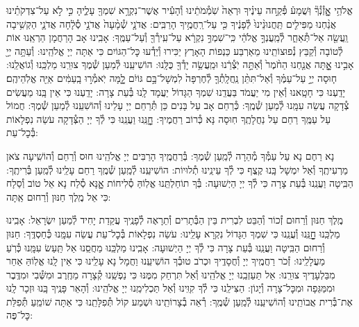 \documentclass[twoside, openany, parskip=half, 11pt]{book}
\begin{document}
אֱלֹהַ֥י אׇׇׇׇזְ֯נְ֯ךָ֘ וּֽשֲׁמָע֒ פְּ֯קַ֣חה עֵינֶ֗יךָ וּרְאֵה֙ שֹֽׁמְ֯מֹתֵ֔ינוּ וְ֯הָעִ֕יר אֲשֶׁר־נִקְרָ֥א שִׁמְךָ֖ עָלֶ֑יהָ כִּ֣י לֹ֣א עַל־צִדְקֹתֵ֗ינוּ אֲנַ֨חְנוּ מַפִּילִ֤ים תַּֽחֲנוּנֵ֨ינוּ֙ לְ֯פָנֶ֔יךָ כִּ֖י עַל־רַֽחֲמֶ֥יךָ הָרַבִּֽים: אֲדֹנָ֤י שְׁ֯מָ֨עָה֙ אֲדֹנָ֣י סְ֯לָ֔חָה אֲדֹנָ֛י הַקְשִׁ֥יבָה וַֽעֲשֵׂ֖ה אַל־תְּ֯אַחַ֑ר לְ֯מַֽעֲנְךָ֣ אֱלֹהַ֔י כִּֽי־שִׁמְךָ֣ נִקְרָ֔א עַל־עִֽירְ֯ךָ֖ וְ֯עַל־עַמֶּֽךָ: אָבִֽינוּ אָב הָרַחֲמָן הַרְאֵֽנוּ אוֹת לְ֯טוֹבָה וְ֯קַבֵּץ נְ֯פוּצוֹתֵֽינוּ מֵאַרְבַּע כַּנְפוֹת הָאָרֶץ יַכִּירוּ וְ֯יֵדְ֯עוּ כׇּל־הַגּוֹיִם כִּי אַתָּה יְיָ אֱלֹהֵֽינוּ:
וְ֯עַתָּ֥ה יְיָ֖ אָבִ֣ינוּ אׇׇׇׇׇֽתָּה אֲנַ֤חְנוּ הַחֹ֨מֶר֙ וְ֯אַתָּ֣ה יֹֽצְ֯רֵ֔נוּ וּמַֽעֲשֵׂ֥ה יָדְ֯ךָ֖ כֻּלָּֽנוּ: הוֹשִׁיעֵֽנוּ לְ֯מַעַן שְׁ֯מֶךָ צוּרֵֽנוּ מַלְכֵּֽנוּ וְ֯גוֹאֲלֵֽנוּ:
ח֧וּסָה יְיָ֣ עַל־עַמֶּ֗ךָ וְ֯אַל־תִּתֵּ֨ן נַֽחֲלָֽתְ֯ךָ֤ לְ֯חֶרְפָּה֙ לִמְשָׁל־בָּ֣ם גּוֹיִ֔ם לׇׇׇ֚מָּה יֹֽאמְ֯ר֣וּ בָֽעַמִּ֔ים אַיֵּ֖ה אֱלֹֽהֵיהֶֽם׃ יָדַֽעְנוּ כִּי חָטָֽאנוּ וְ֯אֵין מִי יַעֲמֹד בַּעֲדֵֽנוּ שִׁמְךָ הַגָּדוֹל יַעֲמָד לָֽנוּ בְּ֯עֵת צָרָה: יָדַֽעְנוּ כִּי אֵין בָּֽנוּ מַעֲשִׂים צְ֯דָקָה עֲשֵׂה עִמָּֽנוּ לְ֯מַעַן שְׁ֯מֶֽךָ: כְּ֯רַחֵם אָב עַל בָּנִים כֵּן תְּ֯רַחֵם יְיָ עָלֵינוּ וְ֯הוֹשִׁעֵֽנוּ לְ֯מַעַן שְׁ֯מֶךָ: חֲמוֹל עַל עַמֶּֽךָ רַחֵם עַל נַחֲלָתֶֽךָ חֽוּסָה נָּא כְּ֯רוֹב רַחֲמֶיךָ: חׇׇׇׇׇׇנֵּֽנוּ וַעֲנֵֽנוּ כִּי לְ֯ךָ יְיָ הַצְּ֯דָקָה עֹשֵׂה נִפְלָאוֹת בְּ֯כׇל־עֵת:



נָא רַחֶם נָא עַל עַמְּ֯ךָ מְ֯הֵרָה לְ֯מַֽעַן שְׁ֯מֶךָ: בְּ֯רַחֲמֶֽיךָ הָרַבִּים יְיָ אֱלֹהֵֽינוּ חוּס וְ֯רַחֵם וְ֯הוֹשִֽׁיעָה צֹאן מַרְעִיתֶֽךָ וְ֯אַל יִמְשָׁל בָּֽנוּ קֶֽצֶף כִּי לְ֯ךָ עֵינֵֽינוּ תְ֯לוּיוֹת: הוֹשִׁיעֵֽנוּ לְ֯מַֽעַן שְׁ֯מֶֽךָ רַחֵם עָלֵֽינוּ לְ֯מַֽעַן בְּ֯רִיתֶֽךָ: הַבִּֽיטָה וַעֲנֵֽנוּ בְּ֯עֵת צָרָה כִּי לְ֯ךָ יְיָ הַיְשׁוּעָה: בְּ֯ךָ תוֹחַלְתֵּֽנוּ אֱלֽוֹהַּ סְ֯לִיחוֹת אׇׇׇנָּא סְ֯לַח נָא אֵל טוֹב וְ֯סַלָח כִּי אֵל מֶֽלֶךְ חַנּוּן וְ֯רַחוּם אַֽתָּה:

מֶֽלֶךְ חַנּוּן וְ֯רַחוּם זְ֯כוֹר וְ֯הַבֵּט לִבְרִית בֵּין הַבְּ֯תָרִים וְ֯תֵרָאֶה לְ֯פָנֶֽיךָ עֲקֵדַת יָחִיד לְ֯מַעַן יִשְׂרָאֵל: אָבִֽינוּ מַלְכֵּֽנוּ חׇׇׇׇׇׇנֵּֽנוּ וְ֯עֲנֵֽנוּ כִּי שִׁמְךָ הַגָּדוֹל נִקְרָא עָלֵֽינוּ: עֹשֵׂה נִפְלָאוֹת בְּ֯כׇל־עֵת עֲשֵׂה עִמָּֽנוּ כְּ֯חַסְדֶּֽךָ: חַנּוּן וְ֯רַחוּם הַבִּֽיטָה וַעֲנֵֽנוּ בְּ֯עֵת צָרָה כִּי לְ֯ךָ יְיָ הַיְשׁוּעָה: אָבִֽינוּ מַלְכֵּֽנוּ מַחֲסֵֽנוּ אַל תַּֽעַשׂ עִמָּֽנוּ כְּ֯רֹֽעַ מַעֲלָלֵֽינוּ: זְ֯כֹר רַחֲמֶֽיךָ יְיָ וְ֯חֲסָדֶֽיךָ וּכְרֹב טוּבְ֯ךָ הוֹשִׁיעֵֽנוּ וַחֲמָל נָא עָלֵֽינוּ כִּי אֵין לָֽנוּ אֱלֽוֹהַּ אַחֵר מִבַּלְעָדֶיךָ צוּרֵֽנוּ: אַל תַּעַזְבֵֽנוּ יְיָ אֱלֹהֵֽינוּ וְ֯אַל תִּרְחַק מִמֶּנּוּ כִּי נַפְשֵֽׁנוּ קְ֯צָרָה מֵחֶֽרֶב וּמִשְּׁ֯בִי וּמִדֶּֽבֶר וּמִמַּגֵּפָה וּמִכׇּל־צָרָה וְ֯יָגוֹן: הַצִּילֵֽנוּ כִּי לְ֯ךָ קִוִּֽינוּ וְ֯אַל תַּכְלִימֵֽנוּ יְיָ אֱלֹהֵֽינוּ: וְ֯הָאֵר פָּנֶֽיךָ בָּֽנוּ וּזְכָר לָֽנוּ אֶת־בְּ֯רִית אֲבוֹתֵֽינוּ וְ֯הוֹשִׁיעֵֽנוּ לְ֯מַֽעַן שְׁ֯מֶֽךָ: רְ֯אֵה בְ֯צָרוֹתֵֽינוּ וּשְׁמַע קוֹל תְּ֯פִלָּתֵֽנוּ כִּי אַתָּה שׁוֹמֵֽעַ תְּ֯פִלַּת כׇּל־פֶּה:
\end{document}

